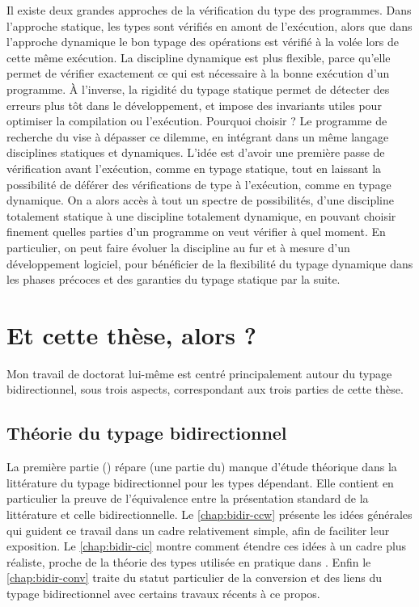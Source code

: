 Il existe deux grandes approches de la vérification du type des programmes.
Dans l’approche statique,
les types sont vérifiés en amont de l’exécution, alors que dans l’approche dynamique le bon typage des opérations est vérifié à la volée lors de cette même exécution.
La discipline dynamique est plus flexible, parce qu’elle permet de vérifier exactement ce qui est nécessaire à la bonne exécution d’un programme.
À l’inverse, la rigidité du typage statique permet de détecter des erreurs plus tôt dans le développement, et impose des invariants utiles pour optimiser la compilation ou l’exécution.
Pourquoi choisir ? Le programme de recherche du   vise à dépasser ce dilemme, en intégrant dans un même langage disciplines statiques et dynamiques.
L’idée est d’avoir une première passe de vérification avant l’exécution, comme en typage statique, tout en laissant la possibilité de déférer des vérifications de type à l’exécution, comme en typage dynamique.
On a alors accès à tout un spectre de possibilités, d’une discipline totalement statique à une discipline totalement dynamique,
en pouvant choisir finement quelles parties d’un programme on veut vérifier à quel moment. En particulier, on peut faire évoluer la discipline au fur et à mesure d’un développement logiciel, pour bénéficier de la flexibilité du typage dynamique dans les phases précoces et des garanties du typage statique par la suite.

\section{Et cette thèse, alors ?}
\label{sec:cette-these}

Mon travail de doctorat lui-même
est centré principalement autour du typage bidirectionnel, sous
trois aspects, correspondant aux trois parties de cette thèse.

\subsection{Théorie du typage bidirectionnel}

La première partie () répare (une partie du) manque d'étude
théorique dans la littérature du typage bidirectionnel pour les types dépendant. Elle contient en particulier la
preuve de l’équivalence entre la présentation standard de la littérature et celle
bidirectionnelle.
Le \cref{chap:bidir-ccw} présente les idées générales qui guident ce travail
dans un cadre relativement simple, afin de faciliter leur exposition. 
Le \cref{chap:bidir-cic} montre comment étendre ces idées à un
cadre plus réaliste, proche de la théorie des types utilisée en pratique dans .
Enfin le \cref{chap:bidir-conv} traite du statut particulier de la
conversion
et des liens du typage bidirectionnel avec certains travaux récents
à ce propos.

